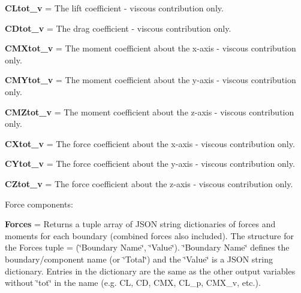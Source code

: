 \begin{DoxyItemize}
\item {\bfseries{CLtot\+\_\+v}} = The lift coefficient -\/ viscous contribution only.
\item {\bfseries{CDtot\+\_\+v}} = The drag coefficient -\/ viscous contribution only.
\item {\bfseries{CMXtot\+\_\+v}} = The moment coefficient about the x-\/axis -\/ viscous contribution only.
\item {\bfseries{CMYtot\+\_\+v}} = The moment coefficient about the y-\/axis -\/ viscous contribution only.
\item {\bfseries{CMZtot\+\_\+v}} = The moment coefficient about the z-\/axis -\/ viscous contribution only.
\item {\bfseries{CXtot\+\_\+v}} = The force coefficient about the x-\/axis -\/ viscous contribution only.
\item {\bfseries{CYtot\+\_\+v}} = The force coefficient about the y-\/axis -\/ viscous contribution only.
\item {\bfseries{CZtot\+\_\+v}} = The force coefficient about the z-\/axis -\/ viscous contribution only.
\end{DoxyItemize}

Force components\+:
\begin{DoxyItemize}
\item {\bfseries{Forces}} = Returns a tuple array of JSON string dictionaries of forces and moments for each boundary (combined forces also included). The structure for the Forces tuple = (\char`\"{}\+Boundary Name\char`\"{}, \char`\"{}\+Value\char`\"{}). \char`\"{}\+Boundary Name\char`\"{} defines the boundary/component name (or \char`\"{}\+Total\char`\"{}) and the \char`\"{}\+Value\char`\"{} is a JSON string dictionary. Entries in the dictionary are the same as the other output variables without \char`\"{}tot\char`\"{} in the name (e.\+g. CL, CD, CMX, CL\+\_\+p, CMX\+\_\+v, etc.). 
\end{DoxyItemize}